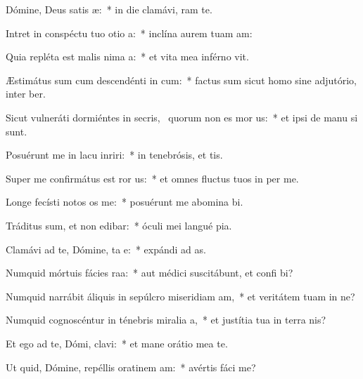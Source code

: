 \item Dómine, Deus satis æ:~* in die clamávi,   ram te.
\item Intret in conspéctu tuo otio a:~* inclína aurem tuam   am:
\item Quia repléta est malis nima a:~* et vita mea inférno vit.
\item Æstimátus sum cum descendénti in cum:~* factus sum sicut homo sine adjutório, inter  ber.
\item Sicut vulneráti dormiéntes in secris,~\pscross{} quorum non es mor us:~* et ipsi de manu  si sunt.
\item Posuérunt me in lacu inriri:~* in tenebrósis, et   tis.
\item Super me confirmátus est ror us:~* et omnes fluctus tuos in per me.
\item Longe fecísti notos os  me:~* posuérunt me abomina bi.
\item Tráditus sum, et non edibar:~* óculi mei langué  pia.
\item Clamávi ad te, Dómine, ta e:~* expándi ad   as.
\item Numquid mórtuis fácies raa:~* aut médici suscitábunt, et confi bi?
\item Numquid narrábit áliquis in sepúlcro miseridiam am,~* et veritátem tuam in ne?
\item Numquid cognoscéntur in ténebris miralia a,~* et justítia tua in terra nis?
\item Et ego ad te, Dómi, clavi:~* et mane orátio mea  te.
\item Ut quid, Dómine, repéllis oratinem am:~* avértis fáci   me?
